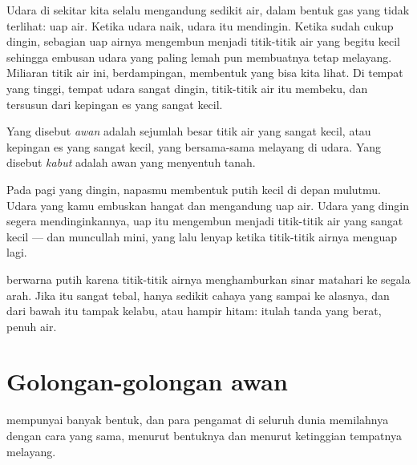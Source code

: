 Udara di sekitar kita selalu mengandung sedikit air, dalam bentuk gas yang
tidak terlihat: uap air. Ketika udara naik, udara itu mendingin. Ketika
sudah cukup dingin, sebagian uap airnya mengembun menjadi titik-titik air
yang begitu kecil sehingga embusan udara yang paling lemah pun membuatnya
tetap melayang. Miliaran titik air ini, berdampingan, membentuk  yang
bisa kita lihat. Di tempat yang tinggi, tempat udara sangat dingin,
titik-titik air itu membeku, dan  tersusun dari kepingan es yang
sangat kecil.

\begin{definition}\label{def:g4:clouds-rain-snow:cloud}
Yang disebut \emph{awan} adalah sejumlah besar titik air yang
sangat kecil, atau kepingan es yang sangat kecil, yang bersama-sama
melayang di udara. Yang disebut \emph{kabut} adalah awan yang
menyentuh tanah.
\end{definition}

\begin{example}\label{ex:g4:clouds-rain-snow:breath}
Pada pagi yang dingin, napasmu membentuk  putih kecil di depan mulutmu.
Udara yang kamu embuskan hangat dan mengandung uap air. Udara yang dingin
segera mendinginkannya, uap itu mengembun menjadi titik-titik air yang
sangat kecil --- dan muncullah  mini, yang lalu lenyap ketika
titik-titik airnya menguap lagi.
\end{example}

 berwarna putih karena titik-titik airnya menghamburkan sinar matahari
ke segala arah. Jika  itu sangat tebal, hanya sedikit cahaya yang
sampai ke alasnya, dan dari bawah  itu tampak kelabu, atau hampir
hitam: itulah tanda  yang berat, penuh air.

\section{Golongan-golongan awan}

 mempunyai banyak bentuk, dan para pengamat  di seluruh dunia
memilahnya dengan cara yang sama, menurut bentuknya dan menurut ketinggian
tempatnya melayang.

